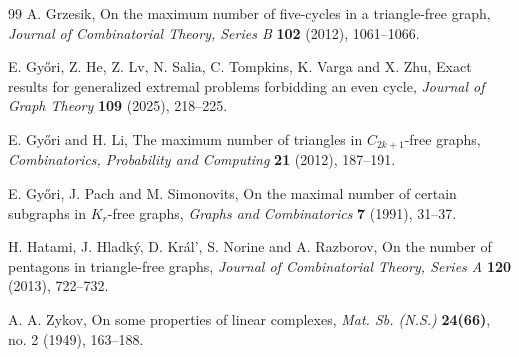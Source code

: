 \documentclass[11pt,letterpaper]{article}
\begin{document}
\begin{thebibliography}{99}
A. Grzesik,
On the maximum number of five-cycles in a triangle-free graph,
\emph{Journal of Combinatorial Theory, Series B} \textbf{102} (2012), 1061--1066.

E. Gy\H{o}ri, Z. He, Z. Lv, N. Salia, C. Tompkins, K. Varga and X. Zhu,
Exact results for generalized extremal problems forbidding an even cycle,
\emph{Journal of Graph Theory} \textbf{109} (2025), 218--225.

E. Gy\H{o}ri and H. Li,
The maximum number of triangles in $C_{2k+1}$-free graphs,
\emph{Combinatorics, Probability and Computing} \textbf{21} (2012), 187--191.

E. Gy\H{o}ri, J. Pach and M. Simonovits,
On the maximal number of certain subgraphs in $K_r$-free graphs,
\emph{Graphs and Combinatorics} \textbf{7} (1991), 31--37.

H. Hatami, J. Hladk\'y, D. Kr\'al', S. Norine and A. Razborov,
On the number of pentagons in triangle-free graphs,
\emph{Journal of Combinatorial Theory, Series A} \textbf{120} (2013), 722--732.

A. A. Zykov,
On some properties of linear complexes,
\emph{Mat. Sb. (N.S.)} \textbf{24(66)}, no. 2 (1949), 163--188.










\end{thebibliography}
\end{document}
